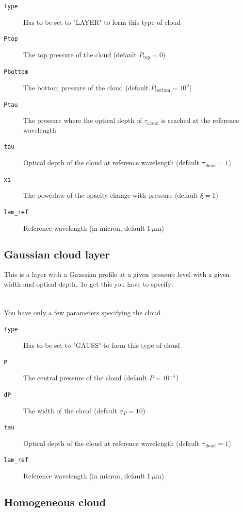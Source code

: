 \documentclass[12pt]{article}
\begin{document}
\begin{description}
\item[\texttt{type}]
Has to be set to "LAYER" to form this type of cloud
\item[\texttt{Ptop}]
The top pressure of the cloud (default $P_\mathrm{top}=0$)
\item[\texttt{Pbottom}]
The bottom pressure of the cloud (default $P_\mathrm{bottom}=10^9$)
\item[\texttt{Ptau}]
The pressure where the optical depth of $\tau_\mathrm{cloud}$ is reached at the reference wavelength
\item[\texttt{tau}]
Optical depth of the cloud at reference wavelength (default $\tau_\mathrm{cloud}=1$)
\item[\texttt{xi}]
The powerlaw of the opacity change with pressure (default $\xi=1$)
\item[\texttt{lam\_ref}]
Reference wavelength (in micron, default 1\,$\mu$m)
\end{description}

\subsection{Gaussian cloud layer}

This is a layer with a Gaussian profile at a given pressure level with a given width and optical depth. To get this you have to specify:
\\
\\
\\
You have only a few parameters specifying the cloud

\begin{description}
\item[\texttt{type}]
Has to be set to "GAUSS" to form this type of cloud
\item[\texttt{P}]
The central pressure of the cloud (default $P=10^{-4}$)
\item[\texttt{dP}]
The width of the cloud (default $\sigma_P=10$)
\item[\texttt{tau}]
Optical depth of the cloud at reference wavelength (default $\tau_\mathrm{cloud}=1$)
\item[\texttt{lam\_ref}]
Reference wavelength (in micron, default 1\,$\mu$m)
\end{description}

\subsection{Homogeneous cloud}
\end{document}
